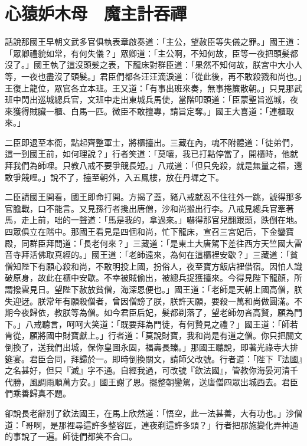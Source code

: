 
\chapter{心猿妒木母　魔主計吞禪}

話說那國王早朝文武多官俱執表章啟奏道：「主公，望赦臣等失儀之罪。」國王道：「眾卿禮貌如常，有何失儀？」眾卿道：「主公啊，不知何故，臣等一夜把頭髮都沒了。」國王執了這沒頭髮之表，下龍床對群臣道：「果然不知何故，朕宮中大小人等，一夜也盡沒了頭髮。」君臣們都各汪汪滴淚道：「從此後，再不敢殺戮和尚也。」王復上龍位，眾官各立本班。王又道：「有事出班來奏，無事捲簾散朝。」只見那武班中閃出巡城總兵官，文班中走出東城兵馬使，當階叩頭道：「臣蒙聖旨巡城，夜來獲得賊臟一櫃、白馬一匹。微臣不敢擅專，請旨定奪。」國王大喜道：「連櫃取來。」

二臣即退至本衙，點起齊整軍士，將櫃擡出。三藏在內，魂不附體道：「徒弟們，這一到國王前，如何理說？」行者笑道：「莫嚷，我已打點停當了，開櫃時，他就拜我們為師哩。只教八戒不要爭競長短。」八戒道：「但只免殺，就是無量之福，還敢爭競哩。」說不了，擡至朝外，入五鳳樓，放在丹墀之下。

二臣請國王開看，國王即命打開。方揭了蓋，豬八戒就忍不住往外一跳，諕得那多官膽戰，口不能言。又見孫行者攙出唐僧，沙和尚搬出行李。八戒見總兵官牽著馬，走上前，咄的一聲道：「馬是我的，拿過來。」嚇得那官兒翻跟頭，跌倒在地。四眾俱立在階中。那國王看見是四個和尚，忙下龍床，宣召三宮妃后，下金鑾寶殿，同群臣拜問道：「長老何來？」三藏道：「是東土大唐駕下差往西方天竺國大雷音寺拜活佛取真經的。」國王道：「老師遠來，為何在這櫃裡安歇？」三藏道：「貧僧知陛下有願心殺和尚，不敢明投上國，扮俗人，夜至寶方飯店裡借宿。因怕人識破原身，故此在櫃中安歇。不幸被賊偷出，被總兵捉獲擡來。今得見陛下龍顏，所謂撥雲見日。望陛下赦放貧僧，海深恩便也。」國王道：「老師是天朝上國高僧，朕失迎迓。朕常年有願殺僧者，曾因僧謗了朕，朕許天願，要殺一萬和尚做圓滿。不期今夜歸依，教朕等為僧。如今君臣后妃，髮都剃落了，望老師勿吝高賢，願為門下。」八戒聽言，呵呵大笑道：「既要拜為門徒，有何贄見之禮？」國王道：「師若肯從，願將國中財寶獻上。」行者道：「莫說財寶，我和尚是有道之僧。你只把關文倒換了，送我們出城，保你皇圖永固，福壽長臻。」那國王聽說，即著光祿寺大排筵宴。君臣合同，拜歸於一。即時倒換關文，請師父改號。行者道：「陛下『法國』之名甚好，但只『滅』字不通。自經我過，可改號『欽法國』，管教你海晏河清千代勝，風調雨順萬方安。」國王謝了恩。擺整朝鑾駕，送唐僧四眾出城西去。君臣們乘善歸真不題。

卻說長老辭別了欽法國王，在馬上欣然道：「悟空，此一法甚善，大有功也。」沙僧道：「哥啊，是那裡尋這許多整容匠，連夜剃這許多頭？」行者把那施變化弄神通的事說了一遍。師徒們都笑不合口。

